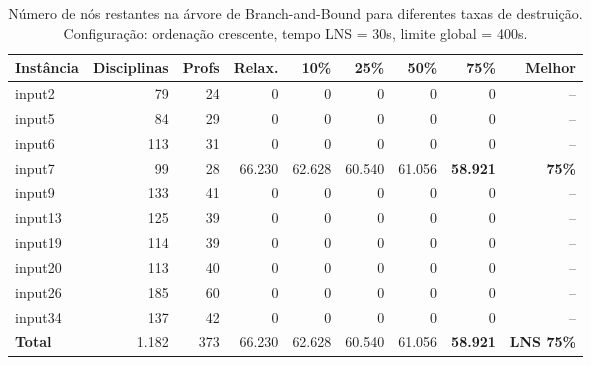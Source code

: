 \begin{table}[htbp]
\centering
\caption{Número de nós restantes na árvore de Branch-and-Bound para diferentes taxas de destruição. Configuração: ordenação crescente, tempo LNS = 30s, limite global = 400s.}
\label{tab:lns_cand_nodes}
\small
\begin{tabular}{@{}lrrrrrrrr@{}}
\toprule
\textbf{Instância} & \textbf{Disciplinas} & \textbf{Profs} & \textbf{Relax.} & \textbf{10\%} & \textbf{25\%} & \textbf{50\%} & \textbf{75\%} & \textbf{Melhor} \\
\midrule
input2  & 79  & 24 & 0      & 0      & 0      & 0      & 0      & -- \\
input5  & 84  & 29 & 0      & 0      & 0      & 0      & 0      & -- \\
input6  & 113 & 31 & 0      & 0      & 0      & 0      & 0      & -- \\
input7  & 99  & 28 & 66.230 & 62.628 & 60.540 & 61.056 & \textbf{58.921} & \textbf{75\%} \\
input9  & 133 & 41 & 0      & 0      & 0      & 0      & 0      & -- \\
input13 & 125 & 39 & 0      & 0      & 0      & 0      & 0      & -- \\
input19 & 114 & 39 & 0      & 0      & 0      & 0      & 0      & -- \\
input20 & 113 & 40 & 0      & 0      & 0      & 0      & 0      & -- \\
input26 & 185 & 60 & 0      & 0      & 0      & 0      & 0      & -- \\
input34 & 137 & 42 & 0      & 0      & 0      & 0      & 0      & -- \\
\midrule
\textbf{Total}  & 1.182 & 373 & 66.230 & 62.628 & 60.540 & 61.056 & \textbf{58.921} & \textbf{LNS 75\%} \\
\bottomrule
\end{tabular}
\end{table}

